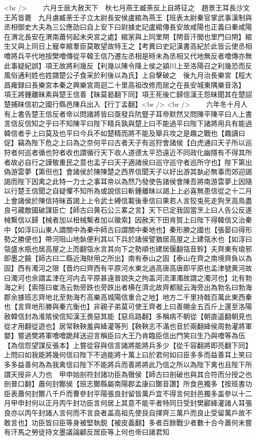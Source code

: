 <br />
　　六月壬辰大赦天下　秋七月燕王臧荼反上自將征之　趙景王耳長沙文王芮皆薨　九月虜臧荼壬子立太尉長安侯盧綰為燕王【班表太尉秦官掌武事漢制與丞相御史大夫為三公應劭曰自上安下曰尉據史記盧綰傳長安故咸陽也正義曰秦咸陽在渭北長安在渭南蕭何起未央宮之處】綰家與上同里閈【閈音汗閭也里門曰閈】綰生又與上同日上寵幸綰羣臣莫敢望故特王之【考異曰史記漢書高紀於此皆云使丞相噲將兵平代地按樊噲傳從平韓王信乃遷左丞相是時未為丞相又代地無反者噲傳亦無此事疑紀誤】項王故將利幾反【利幾以陳令降上侯之潁川上至洛陽召之利幾恐而反風俗通利姓也姓譜楚公子食采於利後以為氏】上自擊破之　後九月治長樂宮【程大昌雍録曰長樂宮本秦之興樂宮周迴二十里高祖改修而居之在長安城東隅樂音洛】　項王將鍾離昧素與楚王信善【昧莫曷翻下同】項王死後亡歸信漢王怨昧聞其在楚詔楚捕昧信初之國行縣邑陳兵出入【行丁孟翻】<br />
<br />
　　六年冬十月人有上書告楚王信反者帝以問諸將皆曰亟發兵阬豎子耳帝默然又問陳平陳平曰人上書言信反信知之乎曰不知陳平曰陛下精兵孰與楚上曰不能過平曰陛下諸將用兵有能過韓信者乎上曰莫及也平曰今兵不如楚精而將不能及舉兵攻之是趣之戰也【趣讀曰促】竊為陛下危之上曰為之奈何平曰古者天子有巡狩會諸侯【白虎通曰天子所以巡狩者何巡者循也狩者收也謂循行天下收人道德太平恐遠近不同政化幽隱有不得其所者故必自行之謹敬重民之意也孟子曰天子適諸侯曰巡守巡守者巡所守也】陛下第出偽游雲夢【第但也】會諸侯於陳陳楚之西界信聞天子以好出游其埶必無事而郊迎謁謁而陛下因禽之此特一力士之事耳帝以為然乃發使告諸侯會陳吾將南游雲夢上因隨以行楚王信聞之自疑懼不知所為或說信曰斬鍾離昧以謁上上必喜無患信從之十二月上會諸侯於陳信持昧首謁上上令武士縛信載後車信曰果若人言狡兎死走狗烹高鳥盡良弓藏敵國破謀臣亡【師古曰黄石公三畧之言】天下已定我固當烹上曰人告公反遂械繫信以歸【械者加以杻械繫者加以徽索】因赦天下田肯賀上曰陛下得韓信又治秦中【如淳曰山東人謂關中為秦中師古曰謂關中秦地也】秦形勝之國也【張晏曰得形勢之勝便也】帶河阻山地埶便利其以下兵於諸侯譬猶居高屋之上建瓴水也【如淳曰瓴盛水瓶也居高屋之上而翻瓴水言其向下之勢順也建居偃翻瓴音鈴】夫齊東有琅邪即墨之饒【師古曰二縣近海財用之所出】南有泰山之固【泰山在齊之南境齊負以為固】西有濁河之限【晋灼曰齊西有平原河水東北過高唐高唐即平原也孟津號黄河故曰濁河也余謂孟津在河内去平原甚遠晉說失之拘盖河流渾濁故謂之濁河也】北有勃海之利【索隱曰崔浩云勃旁跌也旁跌出者横在濟北故齊都賦云海旁出為勃名曰勃海郡余據班志齊地北至勃海冇高樂高城陽信重合之地】地方二千里持戟百萬此東西秦也【言齊地形勝與秦亢衡也】非親子弟莫可使王齊者上曰善賜金五百斤上還至洛陽赦韓信封為淮隂侯信知漢王畏惡其能【惡烏路翻】多稱病不朝從【朝直遥翻朝見也從才用翻從遊也】居常鞅鞅羞與絳灌等列【鞅鞅志不滿也音於兩翻絳侯周勃灌將軍嬰】嘗過樊將軍噲噲跪拜送迎言稱臣曰大王乃肯臨臣信出門笑曰生乃與噲等為伍【為信怨望謀反張本】上嘗從容與信言諸將能將兵多少【從千容翻將即亮翻下同】上問曰如我能將幾何信曰陛下不過能將十萬上曰於君何如曰臣多多而益善耳上笑曰多多益善何為為我禽信曰陛下不能將兵而善將將此乃信之所以為陛下禽也且陛下所謂天授非人力也　甲申始剖符封諸功臣為徹侯【師古曰剖破也與其合符而分授之也剖普口翻】蕭何封酇侯【班志酇縣屬南陽郡孟康曰酇音讚】所食邑獨多【按班書功臣表蕭何封酇八千戶而曹參封平陽張良封留皆萬戶宜不得言何封邑獨多盖參以十二月甲申封何以正月丙午封功臣言何居上其意不能平者特同日受封樊酈絳灌諸人耳張良亦以丙午封諸人言何而不言良者盖高祖先使艮自擇齊三萬戶而良止受留萬戶故不敢言也】功臣皆曰臣等身被堅執鋭【被皮義翻】多者百餘戰少者數十合今蕭何未嘗有汗馬之勞徒持文墨議論顧反居臣等上何也帝曰諸君知